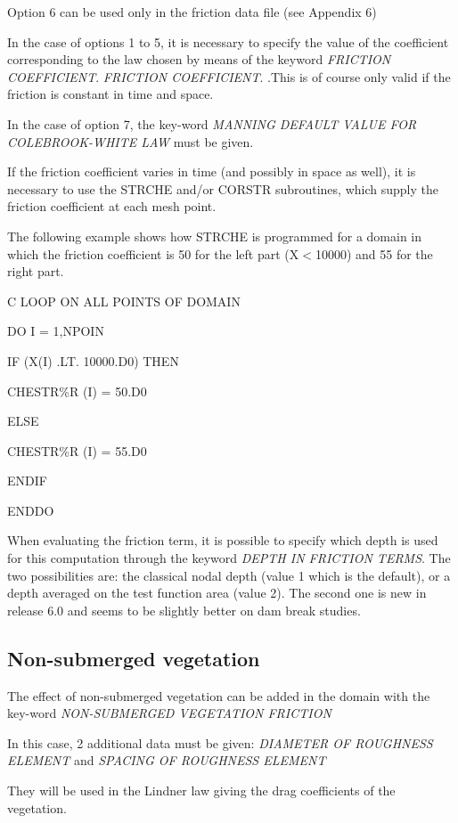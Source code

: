  Option 6 can be used only in the friction data file (see Appendix 6)

 In the case of options 1 to 5, it is necessary to specify the value of the coefficient corresponding to the law chosen by means of the keyword \textit{FRICTION COEFFICIENT}. \textit{FRICTION COEFFICIENT}. .This is of course only valid if the friction is constant in time and space.

 In the case of option 7, the key-word \textit{MANNING DEFAULT VALUE FOR COLEBROOK-WHITE LAW} must be given.

 If the friction coefficient varies in time (and possibly in space as well), it is necessary to use the STRCHE and/or CORSTR subroutines, which supply the friction coefficient at each mesh point.

 The following example shows how STRCHE is programmed for a domain in which the friction coefficient is 50 for the left part (X$<$10000) and 55 for the right part.

 C LOOP ON ALL POINTS OF DOMAIN

  DO I = 1,NPOIN

    IF (X(I) .LT. 10000.D0) THEN

      CHESTR\%R (I) = 50.D0

    ELSE

      CHESTR\%R (I) = 55.D0

    ENDIF

       ENDDO

 When evaluating the friction term, it is possible to specify which depth is used for this computation through the keyword \textit{DEPTH IN FRICTION TERMS}. The two possibilities are: the classical nodal depth (value 1 which is the default), or a depth averaged on the test function area (value 2). The second one is new in release 6.0 and seems to be slightly better on dam break studies.


\subsection{ Non-submerged vegetation}

 The effect of non-submerged vegetation can be added in the domain with the key-word \textit{NON-SUBMERGED VEGETATION FRICTION}

 In this case, 2 additional data must be given: \textit{DIAMETER OF ROUGHNESS ELEMENT }and \textit{SPACING OF ROUGHNESS ELEMENT}

 They will be used in the Lindner law giving the drag coefficients of the vegetation.

